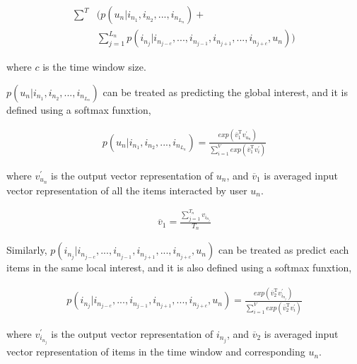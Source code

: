 \documentclass{sig-alternate-05-2015}
\begin{document}
\begin{equation}
\begin{aligned}
	\sum^{T} &\bigg( p(u_n | i_{n_1}, i_{n_2}, ..., i_{n_{L_n}}) + \\
			 &\sum_{j=1}^{L_n} p(i_{n_j} | i_{n_{j-c}}, ..., i_{n_{j-1}}, i_{n_{j+1}},..., i_{n_{j+c}}, u_n) \bigg)
\end{aligned}
\end{equation}

where $c$ is the time window size.

$p(u_n | i_{n_1}, i_{n_2}, ..., i_{n_{L_n}})$ can be treated as predicting the global interest,
and it is defined using a softmax funxtion,

\begin{equation}
\begin{aligned}
	p(u_n | i_{n_1}, i_{n_2}, ..., i_{n_{L_n}}) =
	\frac
	{
		exp( \overline{v}_{1}^{\mathrm{T}} v_{u_n}^{'} )
	}
	{
		\sum_{i=1}^{V} exp( \overline{v}_{1}^{\mathrm{T}} v_{i}^{'} )
	}
\end{aligned}
\end{equation}

where $v_{u_n}^{'}$ is the output vector representation of $u_n$,
and $\overline{v}_{1}$ is averaged input vector representation of all the items
interacted by user $u_n$.

\begin{equation}
\begin{aligned}
	\overline{v}_{1} = \frac{\sum_{j=1}^{T_n} v_{i_{n_j}}}{T_n}
\end{aligned}
\end{equation}

Similarly, $p(i_{n_j} | i_{n_{j-c}}, ..., i_{n_{j-1}}, i_{n_{j+1}},..., i_{n_{j+c}}, u_n)$
can be treated as predict each items in the same local interest,
and it is also defined using a softmax funxtion,

\begin{equation}
\begin{aligned}
	p(i_{n_j} | i_{n_{j-c}}, ..., i_{n_{j-1}}, i_{n_{j+1}},..., i_{n_{j+c}}, u_n) =
	\frac
	{
		exp( \overline{v}_{2}^{\mathrm{T}} v_{i_{n_j}}^{'} )
	}
	{
		\sum_{i=1}^{V} exp( \overline{v}_{2}^{\mathrm{T}} v_{i}^{'} )
	}
\end{aligned}
\end{equation}

where $v_{i_{n_j}}^{'}$ is the output vector representation of $i_{n_j}$,
and $\overline{v}_{2}$ is averaged input vector representation of items in the time window
and corresponding $u_n$.
\end{document}
